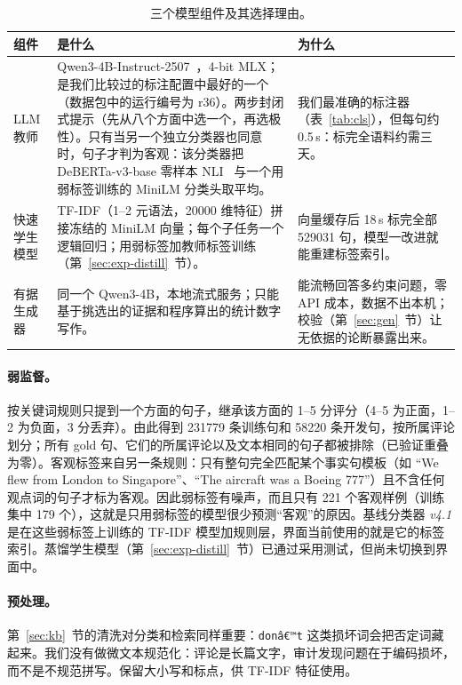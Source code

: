 \documentclass[10pt,twocolumn,a4paper]{article}
\newcommand{\sref}[1]{第~\ref{#1}~节}
\begin{document}
\begin{table}[t]
\centering\small
\caption{三个模型组件及其选择理由。}
\label{tab:approach}
\begin{tabularx}{\textwidth}{@{}P{30mm}YY@{}}
\toprule
\textbf{组件} & \textbf{是什么} & \textbf{为什么} \\
\midrule
LLM 教师 &
Qwen3-4B-Instruct-2507~\cite{qwen3}，4-bit MLX；是我们比较过的标注配置中最好的一个（数据包中的运行编号为 r36）。两步封闭式提示（先从八个方面中选一个，再选极性）。只有当另一个独立分类器也同意时，句子才判为客观：该分类器把 DeBERTa-v3-base 零样本 NLI~\cite{laurer2023} 与一个用弱标签训练的 MiniLM 分类头取平均。 &
我们最准确的标注器（表~\ref{tab:cls}），但每句约 0.5\,s：标完全语料约需三天。 \\
快速学生模型 &
TF-IDF（1--2 元语法，\num{20000} 维特征）拼接冻结的 MiniLM 向量；每个子任务一个逻辑回归；用弱标签加教师标签训练（\sref{sec:exp-distill}）。 &
向量缓存后 18\,s 标完全部 \num{529031} 句，模型一改进就能重建标签索引。 \\
有据生成器 &
同一个 Qwen3-4B，本地流式服务；只能基于挑选出的证据和程序算出的统计数字写作。 &
能流畅回答多约束问题，零 API 成本，数据不出本机；校验（\sref{sec:gen}）让无依据的论断暴露出来。 \\
\bottomrule
\end{tabularx}
\end{table}

\paragraph{弱监督。}按关键词规则只提到一个方面的句子，继承该方面的 1--5 分评分（4--5 为正面，1--2 为负面，3 分丢弃）。由此得到 \num{231779} 条训练句和 \num{58220} 条开发句，按所属评论划分；所有 gold 句、它们的所属评论以及文本相同的句子都被排除（已验证重叠为零）。客观标签来自另一条规则：只有整句完全匹配某个事实句模板（如 “We flew from London to Singapore”、“The aircraft was a Boeing 777”）且不含任何观点词的句子才标为客观。因此弱标签有噪声，而且只有 221 个客观样例（训练集中 179 个），这就是只用弱标签的模型很少预测“客观”的原因。基线分类器 \emph{v4.1} 是在这些弱标签上训练的 TF-IDF 模型加规则层，界面当前使用的就是它的标签索引。蒸馏学生模型（\sref{sec:exp-distill}）已通过采用测试，但尚未切换到界面中。

\paragraph{预处理。}\sref{sec:kb}的清洗对分类和检索同样重要：\texttt{donâ€™t} 这类损坏词会把否定词藏起来。我们没有做微文本规范化：评论是长篇文字，审计发现问题在于编码损坏，而不是不规范拼写。保留大小写和标点，供 TF-IDF 特征使用。
\end{document}

